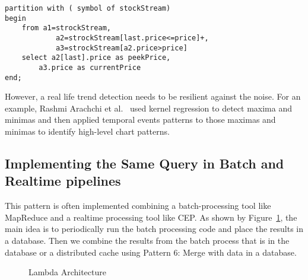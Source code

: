 \documentclass{sig-alternate}
\begin{document}
{\begin{lstlisting}[mathescape, showstringspaces=false]
partition with ( symbol of stockStream)
begin 
    from a1=strockStream, 
            a2=strockStream[last.price<=price]+,
            a3=strockStream[a2.price>price]
    select a2[last].price as peekPrice, 
    	a3.price as currentPrice
end;
\end{lstlisting} 

However, a real life trend detection needs to be resilient against the noise. For an example, Rashmi Arachchi et al.~\cite{chartPatterns} used kernel regression to detect maxima and minimas and then applied temporal events patterns to those maximas and minimas to identify high-level chart patterns. 

\subsection{Implementing the Same Query in Batch and Realtime pipelines}

This pattern is often implemented combining a batch-processing tool like MapReduce and a realtime processing tool like CEP. As shown by Figure~\ref{fig:q3}, the main idea is to periodically run the batch processing code and place the results in a database. Then we combine the results from the batch process that is in the database or a distributed cache using Pattern 6: Merge with data in a database. 

\begin{figure}[!htbp]
\centering
{}
\caption{Lambda Architecture}
\label{fig:q3}
\end{figure}






}
\end{document}
